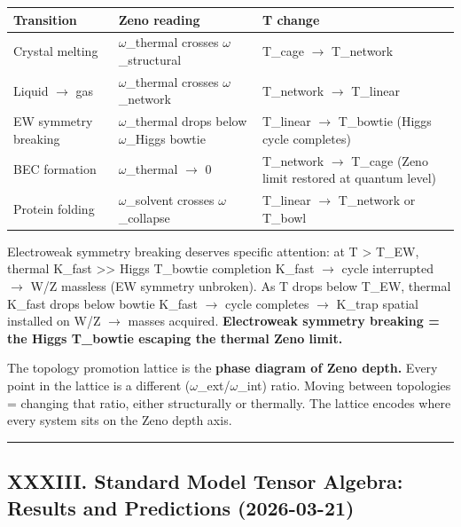 \documentclass[12pt,a4paper]{article}
\begin{document}
\begin{table}[htbp]
\centering
\small
{}
\begin{tabularx}{\textwidth}{>{\centering\arraybackslash}X >{\centering\arraybackslash}X >{\centering\arraybackslash}X}
\toprule
\rowcolor{gray!25}\textbf{Transition} & \textbf{Zeno reading} & \textbf{T change} \\
\midrule
\rowcolors{1}{white}{gray!10}
Crystal melting & $\omega$\_thermal crosses $\omega$\_structural & T\_cage $\rightarrow$ T\_network \\
Liquid $\rightarrow$ gas & $\omega$\_thermal crosses $\omega$\_network & T\_network $\rightarrow$ T\_linear \\
EW symmetry breaking & $\omega$\_thermal drops below $\omega$\_Higgs bowtie & T\_linear $\rightarrow$ T\_bowtie (Higgs cycle completes) \\
BEC formation & $\omega$\_thermal $\rightarrow$ 0 & T\_network $\rightarrow$ T\_cage (Zeno limit restored at quantum level) \\
Protein folding & $\omega$\_solvent crosses $\omega$\_collapse & T\_linear $\rightarrow$ T\_network or T\_bowl \\
\bottomrule
\end{tabularx}
\end{table}

Electroweak symmetry breaking deserves specific attention: at T \textgreater{} T\_EW, thermal K\_fast \textgreater{}\textgreater{} Higgs T\_bowtie completion K\_fast $\rightarrow$ cycle interrupted $\rightarrow$ W/Z massless (EW symmetry unbroken). As T drops below T\_EW, thermal K\_fast drops below bowtie K\_fast $\rightarrow$ cycle completes $\rightarrow$ K\_trap spatial installed on W/Z $\rightarrow$ masses acquired. \textbf{Electroweak symmetry breaking = the Higgs T\_bowtie escaping the thermal Zeno limit.}

The topology promotion lattice is the \textbf{phase diagram of Zeno depth.} Every point in the lattice is a different ($\omega$\_ext/$\omega$\_int) ratio. Moving between topologies = changing that ratio, either structurally or thermally. The lattice encodes where every system sits on the Zeno depth axis.

\begin{center}
\rule{0.5\textwidth}{0.4pt}
\end{center}

\subsection{XXXIII. Standard Model Tensor Algebra: Results and Predictions (2026-03-21)}
\end{document}
